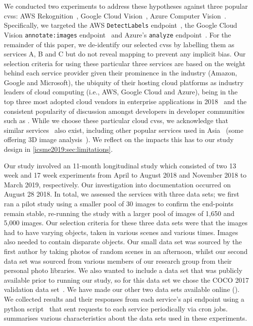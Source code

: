We conducted two experiments to address these hypotheses against three popular \glspl{cvs}: AWS Rekognition~, Google Cloud Vision~, Azure Computer Vision~. Specifically, we targeted the AWS \texttt{DetectLabels} endpoint~, the Google Cloud Vision \texttt{annotate:images} endpoint~ and Azure's \texttt{analyze} endpoint~. For the remainder of this paper, we de-identify our selected \glspl{cvs} by labelling them as services A, B and C but do not reveal mapping to prevent any implicit bias.
Our selection criteria for using these particular three services are based on the weight behind each service provider given their prominence in the industry (Amazon, Google and Microsoft), the ubiquity of their hosting cloud platforms as industry leaders of cloud computing (i.e., AWS, Google Cloud and Azure), being in the top three most adopted cloud vendors in enterprise applications in 2018~\citep{RightScaleInc:2018kJ} and the consistent popularity of discussion amongst developers in developer communities such as . While we choose these particular cloud \glspl{cvs}, we  acknowledge that similar services~ also exist, including other popular services used in Asia~ (some offering 3D image analysis~). We reflect on the impacts this has to our study design in \cref{icsme2019:sec:limitations}.

Our study involved an 11-month longitudinal study which consisted of two 13 week and 17 week experiments from April to August 2018 and November 2018 to March 2019, respectively. Our investigation into documentation occurred on August 28 2018. In total, we assessed the services with three data sets; we first ran a pilot study using a smaller pool of 30 images to confirm the end-points remain stable, re-running the study with a larger pool of images of 1,650 and 5,000 images. Our selection criteria for these three data sets were that the images had to have varying objects, taken in various scenes and various times. Images also needed to contain disparate objects. Our small data set was sourced by the first author by taking photos of random scenes in an afternoon, whilst our second data set was sourced from various members of our research group from their personal photo libraries. We also wanted to include a data set that was publicly available prior to running our study, so for this data set we chose the COCO 2017 validation data set~\citep{Lin:2014vma}. We have made our other two data sets available online (). We collected results and their responses from each service's \gls{api} endpoint  using a  python script~ that sent requests to each service periodically via cron jobs.  summarises various characteristics about the data sets used in these experiments.

